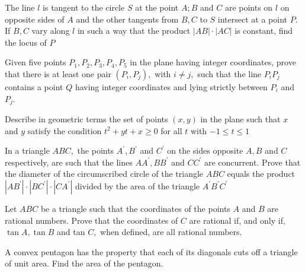 \documentclass{pset}
\begin{document}
\begin{problems}
\begin{problem}[IrMO 1993 Q3]
    The line \(l\) is tangent to the circle \(S\) at the point \(A ; B\) and \(C\) are points on \(l\) on opposite sides of \(A\) and the other tangents from \(B, C\) to \(S\) intersect at a point \(P .\)
    If \(B, C\) vary along \(l\) in such a way that the product \(|A B| \cdot|A C|\) is constant, find the locus of \(P\)
\end{problem}

\begin{problem}[IrMO 1993 Q6]
    Given five points \(P_{1}, P_{2}, P_{3}, P_{4}, P_{5}\) in the plane having integer coordinates, prove that there is at least one pair \(\left(P_{i}, P_{j}\right),\) with \(i \neq j,\) such that the line \(P_{i} P_{j}\) contains
    a point \(Q\) having integer coordinates and lying strictly between \(P_{i}\) and \(P_{j}\).
\end{problem}

\begin{problem}[IrMO 1992 Q1]
    Describe in geometric terms the set of points \((x, y)\) in the plane such that \(x\) and \(y\) satisfy the condition \(t^{2}+y t+x \geq 0\) for all \(t\) with \(-1 \leq t \leq 1\)
\end{problem}

\begin{problem}[IrMO 1992 Q4]
    In a triangle \(A B C,\) the points \(A^{\prime}, B^{\prime}\) and \(C^{\prime}\) on the sides opposite \(A, B\) and \(C\) respectively, are such that the lines \(A A^{\prime}, B B^{\prime}\) and \(C C^{\prime}\) are concurrent. Prove that the diameter of the circumscribed circle of the triangle \(A B C\) equals the product \(\left|A B^{\prime}\right| \cdot\left|B C^{\prime}\right| \cdot\left|C A^{\prime}\right|\) divided by the area of the triangle \(A^{\prime} B^{\prime} C^{\prime}\)
\end{problem}

\begin{problem}[IrMO 1992 Q5]
    Let \(A B C\) be a triangle such that the coordinates of the points \(A\) and \(B\) are rational numbers. Prove that the coordinates of \(C\) are rational if, and only if, \(\tan A, \tan B\) and tan \(C,\) when defined, are all rational numbers.
\end{problem}

\begin{problem}[IrMO 1992 Q9]
    A convex pentagon has the property that each of its diagonals cuts off a triangle of unit area. Find the area of the pentagon.
\end{problem}


\end{problems}
\end{document}

